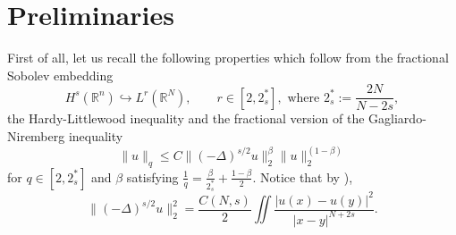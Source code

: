 \documentclass[10pt]{amsart}
\numberwithin{equation}{section}
\begin{document}
\section{Preliminaries}
\label{preliminaries}
\noindent
First of all, let us recall the following properties which follow from the fractional Sobolev embedding
\begin{equation*}
H^{s}(\mathbb R^{n})\hookrightarrow L^{r}(\mathbb R^{N}), 
\qquad 
r\in [2,2_{s}^*], 
\text{ where } 
2_{s}^{*}:=\frac{2N}{N-2s},
\end{equation*}
the Hardy-Littlewood inequality and the fractional version of the Gagliardo-Niremberg inequality
\begin{equation}\label{FracGN}
 \|u\|_{q} \leq C \|(-\Delta)^{s/2}u\|_{2}^{\beta} 
\|u\|_{2}^{(1-\beta)}
\end{equation}
for $q\in [2,2^{*}_{s}]$ and  $\beta$ satisfying
$\frac{1}{q}=\frac{\beta}{2^*_{s}}+\frac{1-\beta}{2}$.
Notice that by \cite[Proposition 3.6]{DPV}),
\begin{equation}\label{gagliarda}
\|(-\Delta)^{s/2}u\|_{2}^{2}=\frac{C(N,s)}{2}\iint \frac{|u(x)-u(y)|^{2}}{|x-y|^{N+2s}}.
\end{equation}
\end{document}
